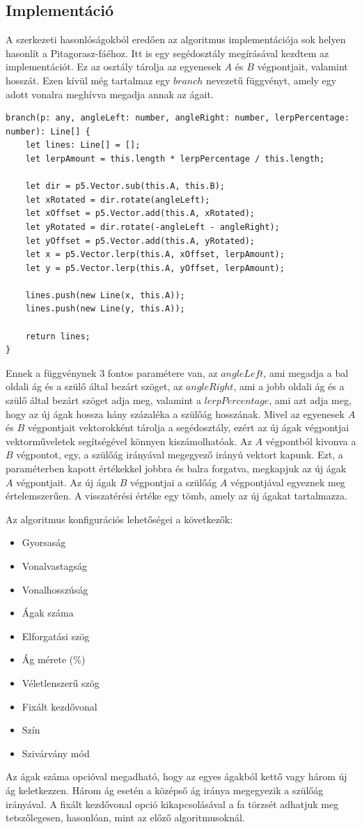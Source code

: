 \subsection*{Implementáció}
A szerkezeti hasonlóságokból eredően az algoritmus implementációja sok helyen hasonlít a Pitagorasz-fáéhoz. Itt is egy segédosztály megírásával kezdtem az implementációt. Ez az osztály tárolja az egyenesek $A$ és $B$ végpontjait, valamint hosszát. Ezen kívül még tartalmaz egy $branch$ nevezetű függvényt, amely egy adott vonalra meghívva megadja annak az ágait. 
\begin{lstlisting}
branch(p: any, angleLeft: number, angleRight: number, lerpPercentage: number): Line[] {
	let lines: Line[] = [];
	let lerpAmount = this.length * lerpPercentage / this.length;
	
	let dir = p5.Vector.sub(this.A, this.B);
	let xRotated = dir.rotate(angleLeft);
	let xOffset = p5.Vector.add(this.A, xRotated);
	let yRotated = dir.rotate(-angleLeft - angleRight);
	let yOffset = p5.Vector.add(this.A, yRotated);
	let x = p5.Vector.lerp(this.A, xOffset, lerpAmount);
	let y = p5.Vector.lerp(this.A, yOffset, lerpAmount);
	
	lines.push(new Line(x, this.A));
	lines.push(new Line(y, this.A));
	
	return lines;
}
\end{lstlisting}
Ennek a függvénynek 3 fontos paramétere van, az $angleLeft$, ami megadja a bal oldali ág és a szülő által bezárt szöget, az $angleRight$, ami a jobb oldali ág és a szülő által bezárt szöget adja meg, valamint a $lerpPercentage$, ami azt adja meg, hogy az új ágak hossza hány százaléka a szülőág hosszának. Mivel az egyenesek $A$ és $B$ végpontjait vektorokként tárolja a segédosztály, ezért az új ágak végpontjai vektorműveletek segítségével könnyen kiszámolhatóak. Az $A$ végpontból kivonva a $B$ végpontot, egy, a szülőág irányával megegyező irányú vektort kapunk. Ezt, a paraméterben kapott értékekkel jobbra és balra forgatva, megkapjuk az új ágak $A$ végpontjait. Az új ágak $B$ végpontjai a szülőág $A$ végpontjával egyeznek meg értelemszerűen. A visszatérési értéke egy tömb, amely az új ágakat tartalmazza.
\par Az algoritmus konfigurációs lehetőségei a következők:
\begin{itemize}
	\item Gyorsaság
	\item Vonalvastagság
	\item Vonalhosszúság
	\item Ágak száma
	\item Elforgatási szög
	\item Ág mérete (\%)
	\item Véletlenszerű szög
	\item Fixált kezdővonal
	\item Szín
	\item Szivárvány mód
\end{itemize}
Az ágak száma opcióval megadható, hogy az egyes ágakból kettő vagy három új ág keletkezzen. Három ág esetén a középső ág iránya megegyezik a szülőág irányával. A fixált kezdővonal opció kikapcsolásával a fa törzsét adhatjuk meg tetszőlegesen, hasonlóan, mint az előző algoritmusoknál.
